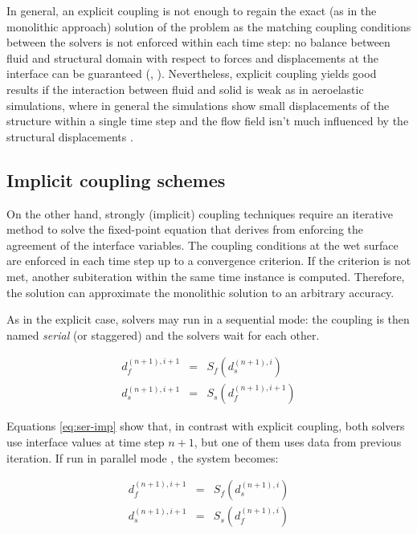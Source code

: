 In general, an explicit coupling is not enough to regain the exact (as in the monolithic approach) solution of the problem as the matching coupling conditions between the solvers is not enforced within each time step: no balance between fluid and structural domain with respect to forces and displacements at the interface can be guaranteed (\cite{hou2012numerical}, \cite{degroote2009performance}). Nevertheless, explicit coupling yields good results if the interaction between fluid and solid is weak as in aeroelastic simulations, where in general the simulations show small displacements of the structure within a single time step and the flow field isn't much influenced by the structural displacements \cite{farhat2006provably}.

\subsection{Implicit coupling schemes}
\label{subsec:implicit}

On the other hand, strongly (implicit) coupling techniques require an iterative method to solve the fixed-point equation that derives from enforcing the agreement of the interface variables.
The coupling conditions at the wet surface are enforced in each time step up to a convergence criterion. If the criterion is not met, another subiteration within the same time instance is computed. Therefore, the solution can approximate the monolithic solution to an arbitrary accuracy.

As in the explicit case, solvers may run in a sequential mode: the coupling is then named \textit{serial} (or staggered) and the solvers wait for each other. 

\begin{subequations}
	\begin{eqnarray}
		d_f^{(n+1),i+1} &=& S_f\left(d_s^{(n+1),i}\right) \\
		d_s^{(n+1),i+1} &=& S_s\left( d_f^{(n+1),i+1} \right)
	\end{eqnarray} 
	\label{eq:ser-imp}
\end{subequations}

Equations \ref{eq:ser-imp} show that, in contrast with explicit coupling, both solvers use interface values at time step $n+1$, but one of them uses data from previous iteration.
If run in parallel mode \cite{mehl2016parallel}, the system becomes:

\begin{subequations}
	\begin{eqnarray}
		d_f^{(n+1),i+1} &=& S_f\left(d_s^{(n+1),i}\right) \\
		d_s^{(n+1),i+1} &=& S_s\left( d_f^{(n+1),i} \right)
	\end{eqnarray} 
	\label{eq:par-imp}
\end{subequations}


